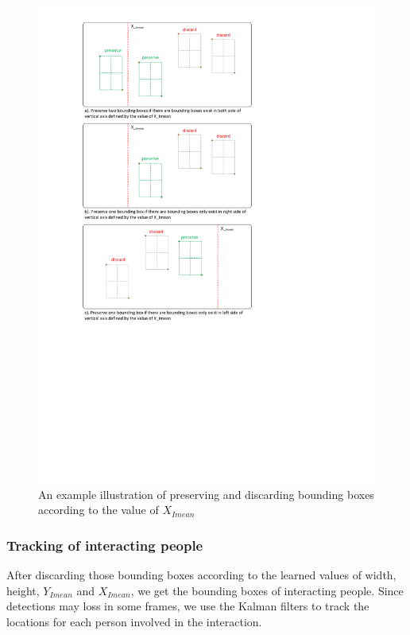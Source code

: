 \begin{figure}
	\includegraphics[trim=2cm 10cm 0cm 1cm]{fig01/x_mean.pdf}
	\caption{An example illustration of preserving and discarding bounding boxes according to the value of \(X_{Imean}\)}
	\label{fig:x_mean}
\end{figure}

\subsubsection*{Tracking of interacting people}
After discarding those bounding boxes according to the learned values of width, height, \(Y_{Imean}\) and \(X_{Imean}\), we get the bounding boxes of interacting people. Since detections may loss in some frames, we use the Kalman filters to track the locations for each person involved in the interaction. 

